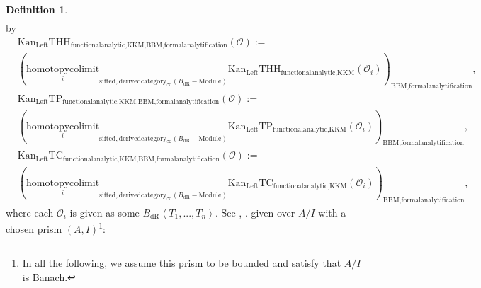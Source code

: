 \documentclass[11pt]{book}
\theoremstyle{definition}
\newtheorem{definition}[theorem]{Definition}
\numberwithin{equation}{section}
\begin{document}
\begin{definition}
{\begin{align}
\end{align}
by
\begin{align}
	&\mathrm{Kan}_{\mathrm{Left}}\mathrm{THH}_{\text{functionalanalytic,KKM},\text{BBM,formalanalytification}}(\mathcal{O}):=\\
	&(\underset{i}{\text{homotopycolimit}}_{\text{sifted},\text{derivedcategory}_{\infty}(B_\mathrm{dR}-\text{Module})}\mathrm{Kan}_{\mathrm{Left}}\mathrm{THH}_{\text{functionalanalytic,KKM}}(\mathcal{O}_i))_\text{BBM,formalanalytification},\\
	&\mathrm{Kan}_{\mathrm{Left}}\mathrm{TP}_{\text{functionalanalytic,KKM},\text{BBM,formalanalytification}}(\mathcal{O}):=\\
	&(\underset{i}{\text{homotopycolimit}}_{\text{sifted},\text{derivedcategory}_{\infty}(B_\mathrm{dR}-\text{Module})}\mathrm{Kan}_{\mathrm{Left}}\mathrm{TP}_{\text{functionalanalytic,KKM}}(\mathcal{O}_i))_\text{BBM,formalanalytification},\\
	&\mathrm{Kan}_{\mathrm{Left}}\mathrm{TC}_{\text{functionalanalytic,KKM},\text{BBM,formalanalytification}}(\mathcal{O}):=\\
	&(\underset{i}{\text{homotopycolimit}}_{\text{sifted},\text{derivedcategory}_{\infty}(B_\mathrm{dR}-\text{Module})}\mathrm{Kan}_{\mathrm{Left}}\mathrm{TC}_{\text{functionalanalytic,KKM}}(\mathcal{O}_i))_\text{BBM,formalanalytification},
\end{align}
where each $\mathcal{O}_i$ is given as some $B_\mathrm{dR}\left<T_1,...,T_n\right>$. See \cite{G2}, \cite{12G1}.} given over $A/I$ with a chosen prism $(A,I)$\footnote{In all the following, we assume this prism to be bounded and satisfy that $A/I$ is Banach.}:



\end{definition}
\end{document}
